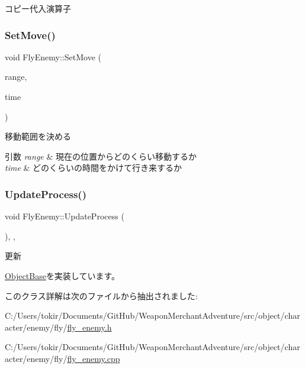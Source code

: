 コピー代入演算子 

\mbox{\label{class_fly_enemy_a137e5a5f2adb7eacd282bbf662242cb3}} 
\subsubsection{\texorpdfstring{Set\+Move()}{SetMove()}}
{\footnotesize\ttfamily void Fly\+Enemy\+::\+Set\+Move (\begin{DoxyParamCaption}\item[{const \mbox{\hyperlink{common_8h_afb0c5e21d4133ff4f200992c0b534e1b}{V\+E\+C2}} \&}]{range,  }\item[{float}]{time }\end{DoxyParamCaption})\hspace{0.3cm}{\ttfamily [inline]}}



移動範囲を決める 


\begin{DoxyParams}{引数}
{\em range} & 現在の位置からどのくらい移動するか \\
\hline
{\em time} & どのくらいの時間をかけて行き来するか \\
\hline
\end{DoxyParams}
\mbox{\label{class_fly_enemy_a5122c8fea26ebbd0390acfd6e41931ff}} 
\subsubsection{\texorpdfstring{Update\+Process()}{UpdateProcess()}}
{\footnotesize\ttfamily void Fly\+Enemy\+::\+Update\+Process (\begin{DoxyParamCaption}{ }\end{DoxyParamCaption})\hspace{0.3cm}{\ttfamily [final]}, {\ttfamily [protected]}, {\ttfamily [virtual]}}



更新 



\mbox{\hyperlink{class_object_base_a8b5b72b363a419767efde0b0e692ea95}{Object\+Base}}を実装しています。



このクラス詳解は次のファイルから抽出されました\+:\begin{DoxyCompactItemize}
\item 
C\+:/\+Users/tokir/\+Documents/\+Git\+Hub/\+Weapon\+Merchant\+Adventure/src/object/character/enemy/fly/\mbox{\hyperlink{fly__enemy_8h}{fly\+\_\+enemy.\+h}}\item 
C\+:/\+Users/tokir/\+Documents/\+Git\+Hub/\+Weapon\+Merchant\+Adventure/src/object/character/enemy/fly/\mbox{\hyperlink{fly__enemy_8cpp}{fly\+\_\+enemy.\+cpp}}\end{DoxyCompactItemize}
